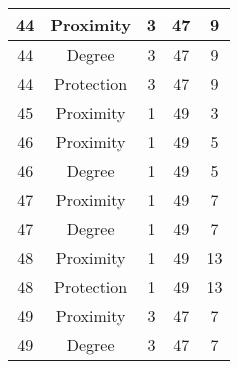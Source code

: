 \documentclass[results.tex]{subfiles}
\begin{document}
\begin{center}
\begin{tabular}{| c || c | c | c | c |}
            \hline
            44                      & Proximity                    & 3                      & 47                      & 9                    \\
            \hline
            44                      & Degree                       & 3                      & 47                      & 9                    \\
            \hline
            44                      & Protection                   & 3                      & 47                      & 9                    \\
            \hline
            45                      & Proximity                    & 1                      & 49                      & 3                    \\
            \hline
            46                      & Proximity                    & 1                      & 49                      & 5                    \\
            \hline
            46                      & Degree                       & 1                      & 49                      & 5                    \\
            \hline
            47                      & Proximity                    & 1                      & 49                      & 7                    \\
            \hline
            47                      & Degree                       & 1                      & 49                      & 7                    \\
            \hline
            48                      & Proximity                    & 1                      & 49                      & 13                   \\
            \hline
            48                      & Protection                   & 1                      & 49                      & 13                   \\
            \hline
            49                      & Proximity                    & 3                      & 47                      & 7                    \\
            \hline
            49                      & Degree                       & 3                      & 47                      & 7                    \\
            \hline
        \end{tabular}
    \end{center}
\end{document}
